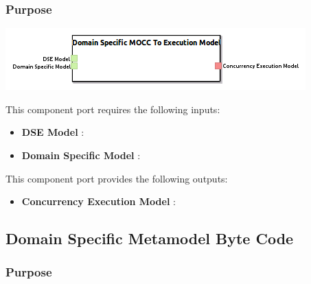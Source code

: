 \documentclass{gemoc} %
\begin{document}

\subsubsection{Purpose}


\begin{center}
\includegraphics*[trim=0.0cm 0.0cm 0cm 0.0cm, clip=true]{../images/generated/Generated_Domain_Specific_MOCC_To_Execution_Model.png}
\end{center}

This component port requires the following inputs:
\begin{itemize}
  \item \textbf{DSE Model} :
  \item \textbf{Domain Specific Model} :
\end{itemize}

This component port provides the following outputs:
\begin{itemize}
  \item \textbf{Concurrency Execution Model} :
\end{itemize}


\subsection{Domain Specific Metamodel Byte Code}


\subsubsection{Purpose}
\end{document}
